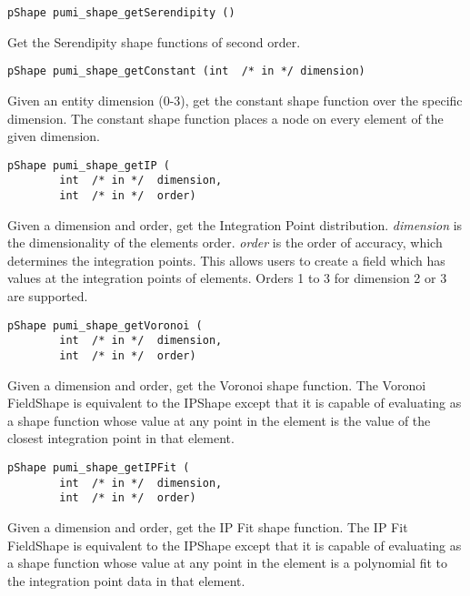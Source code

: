 \begin{verbatim}
pShape pumi_shape_getSerendipity ()
\end{verbatim}\vspace{-.5cm}\hspace{1cm}
Get the Serendipity shape functions of second order.

\begin{verbatim}
pShape pumi_shape_getConstant (int  /* in */ dimension)
\end{verbatim}\vspace{-.5cm}\hspace{1cm}
Given an entity dimension ($0$-$3$), get the constant shape function over the specific dimension. 
The constant shape function places a node on every element of the given dimension. 

\begin{verbatim}
pShape pumi_shape_getIP (
        int  /* in */  dimension, 
        int  /* in */  order)
\end{verbatim}\vspace{-.5cm}\hspace{1cm}
Given a dimension and order, get the Integration Point distribution. \emph{dimension} is the dimensionality of the elements order. \emph{order} is the order of accuracy, which determines the integration points. This allows users to create a field which has values at the integration points of elements. Orders 1 to 3 for dimension 2 or 3 are supported.

\begin{verbatim}
pShape pumi_shape_getVoronoi (
        int  /* in */  dimension,
        int  /* in */  order)
\end{verbatim}\vspace{-.5cm}\hspace{1cm}
Given a dimension and order, get the Voronoi shape function. The Voronoi FieldShape is equivalent to the IPShape except that it is capable of evaluating as a shape function whose value at any point in the element is the value of the closest
 integration point in that element.

\begin{verbatim}
pShape pumi_shape_getIPFit (
        int  /* in */  dimension,
        int  /* in */  order)
\end{verbatim}\vspace{-.5cm}\hspace{1cm}
Given a dimension and order, get the IP Fit shape function. The IP Fit FieldShape is equivalent to the IPShape except
 that it is capable of evaluating as a shape function whose value at any point in the element is a polynomial fit to
 the integration point data in that element.

